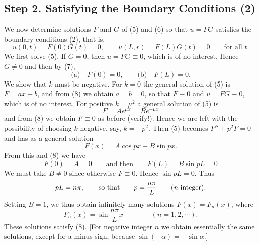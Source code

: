 \documentclass[12pt, leqno, oneside]{amsart}
\begin{document}
\subsection{Step 2. Satisfying the Boundary Conditions (2)}

We now determine solutions $F$ and $G$ of (5) and (6) so that $u=FG$ satisfies 
the boundary conditions (2), that is,
\begin{equation}
    u(0,t)=F(0)G(t)=0, \qquad u(L,r)=F(L)G(t)=0 \qquad \text{for all }t.
\end{equation}
We first solve (5). If $G=0$, then $u=FG\equiv0$, which is of no interest. 
Hence $G\neq0$ and then by (7),
\begin{equation}
    \text{(a)} \quad F(0)=0, \qquad \text{(b)} \quad F(L)=0.
\end{equation}
We show that $k$ must be negative. For $k=0$ the general solution of (5) is
$F=ax+b$, and from (8) we obtain $a=b=0$, so that $F\equiv0$ and 
$u=FG\equiv0$, which is of no interest. For positive $k=\mu^2$ a general 
solution of (5) is
\begin{equation}
  \nonumber
    F=Ae^{\mu x} = Be^{-\mu x}
\end{equation}
and from (8) we obtain $F\equiv0$ as before (verify!). Hence we are left with 
the possibility of choosing $k$ negative, say, $k=-p^2$. Then (5) becomes 
$F''+p^2F=0$ and has as a general solution
\begin{equation}
  \nonumber
    F(x)=A\cos{px} + B\sin{px}.
\end{equation}
From this and (8) we have
\begin{equation}
  \nonumber
    F(0)=A=0 \qquad \text{and then} \qquad F(L)=B\sin{pL}=0
\end{equation}
We must take $B\neq0$ since otherwise $F\equiv0$. Hence $\sin{pL}=0$. Thus
\begin{equation}
    pL=n\pi, \qquad \text{so that} \qquad p=\frac{n\pi}{L} \qquad \qquad \\
        \text{(\emph{n} integer)}.
\end{equation}
Setting $B=1$, we thus obtain infinitely many solutions $F(x)=F_n(x)$, where
\begin{equation}
    F_n(x)=\sin{ \frac{n\pi}{L} x} \qquad \qquad (n=1,2,\dotsb).
\end{equation}
These solutions satisfy (8). [For negative integer $n$ we obtain essentially 
the same solutions, except for a minus sign, because 
$\sin{(-\alpha)}=-\sin{\alpha}$.]
\end{document}
